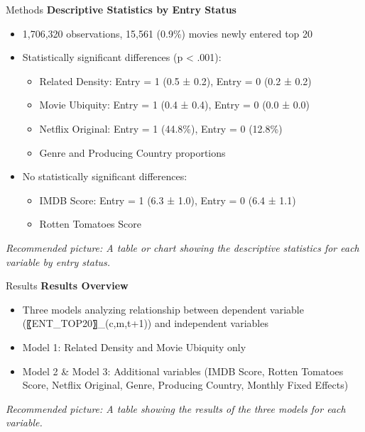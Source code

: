 \documentclass[
  ignorenonframetext,
]{beamer}
\begin{document}
\begin{frame}{Methods}
\protect\hypertarget{methods-3}{}
\textbf{Descriptive Statistics by Entry Status}

\begin{itemize}
\item
  1,706,320 observations, 15,561 (0.9\%) movies newly entered top 20
\item
  Statistically significant differences (p \textless{} .001):

  \begin{itemize}
  \item
    Related Density: Entry = 1 (0.5 ± 0.2), Entry = 0 (0.2 ± 0.2)
  \item
    Movie Ubiquity: Entry = 1 (0.4 ± 0.4), Entry = 0 (0.0 ± 0.0)
  \item
    Netflix Original: Entry = 1 (44.8\%), Entry = 0 (12.8\%)
  \item
    Genre and Producing Country proportions
  \end{itemize}
\item
  No statistically significant differences:

  \begin{itemize}
  \item
    IMDB Score: Entry = 1 (6.3 ± 1.0), Entry = 0 (6.4 ± 1.1)
  \item
    Rotten Tomatoes Score
  \end{itemize}
\end{itemize}

\emph{Recommended picture: A table or chart showing the descriptive
statistics for each variable by entry status.}
\end{frame}

\begin{frame}{Results}
\protect\hypertarget{results}{}
\textbf{Results Overview}

\begin{itemize}
\item
  Three models analyzing relationship between dependent variable
  (〖ENT\_TOP20〗\_(c,m,t+1)) and independent variables
\item
  Model 1: Related Density and Movie Ubiquity only
\item
  Model 2 \& Model 3: Additional variables (IMDB Score, Rotten Tomatoes
  Score, Netflix Original, Genre, Producing Country, Monthly Fixed
  Effects)
\end{itemize}

\emph{Recommended picture: A table showing the results of the three
models for each variable.}
\end{frame}
\end{document}
